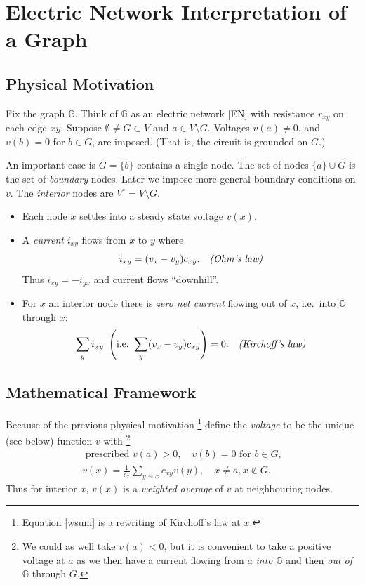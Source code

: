 \documentclass[a4paper]{amsart}
\theoremstyle{plain}
\theoremstyle{definition}
\theoremstyle{remark}
\begin{document}

\section{\textbf{Electric Network Interpretation of a Graph}}  \label{secEN}

\subsection{Physical Motivation} \label{pm}  Fix the graph $  \mathbb{G}  $.  Think of $  \mathbb{G}  $ as an electric network [EN] with resistance $ r_{xy} $ on each edge $ xy $. Suppose $ \emptyset\neq G \subset V $ and $ a \in V \setminus G $.  
Voltages $ v(a) \neq 0 $, and $ v(b) = 0  $ for $ b \in G $, are imposed.  (That is, the circuit is grounded on $ G $.)  

An important case is $ G = \{ b \} $ contains a single node.  The set of nodes $\{ a\} \cup G   $  is the set of \emph{boundary} nodes.   Later we impose  more general boundary conditions on $ v $.  The \emph{interior} nodes are $ V^\circ = V \setminus G $.

\begin{itemize}
\item
Each node $ x $  settles into a steady state voltage $ v(x) $.
\item A \emph{current} $ i_{xy} $ flows from $ x $ to $ y $ where 
\[ i_{xy} = (v_x - v_y) c_{xy}. \text{\quad \emph{(Ohm's law)}}\]
Thus $ i_{xy} = - i_{yx} $ and current  flows ``downhill''.

\item For $ x  $ an interior node there is \emph{zero net current} flowing out of   $ x $, i.e.\ into $  \mathbb{G}  $ through $ x $:
\[  \sum_y i_{xy}\  \left(\text{i.e.}\ \sum_y (v_x - v_y) c_{xy}\right) = 0.  \text{\quad \emph{(Kirchoff's law)}}\]

 \end{itemize} 
   
\subsection{Mathematical Framework}\label{mf}
Because of the previous physical motivation%
\footnote{Equation  \eqref{wsum} is a rewriting of Kirchoff's law at $ x $.}  
define  the \emph{voltage}  to be the unique (see below) function $ v $ with%
\footnote{We could as well take $ v(a) < 0 $, but it is convenient to take a positive voltage at $ a $ as we then have a current flowing from $ a $ \emph{into} $ \mathbb{G} $ and then \emph{out of} $ \mathbb{G} $ through $ G $.}
\begin{gather}
 \text{ prescribed } v(a)>0,\quad   v(b)=0 \text{ for } b \in G,
   \label{wbd}  \\
  v(x) = \frac{1}{c_x} \sum_{y\sim x} c_{xy}v(y)  , \quad x\neq a, x \not\in  G.  \label{wsum}
 \end{gather}
  Thus for interior $ x  $, $ v(x) $ is a \emph{weighted average} of $ v $ at neighbouring nodes. 
  
\end{document}
